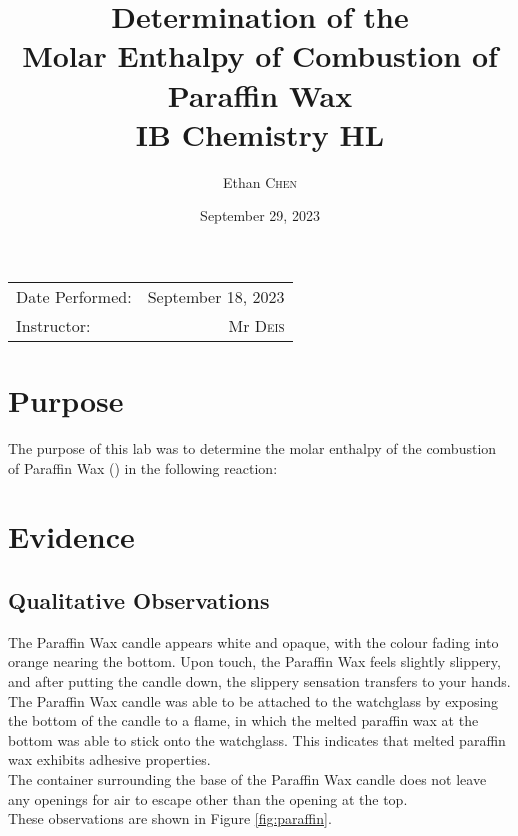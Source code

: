 \documentclass[
	letterpaper, %
	12pt, %
]{CSUniSchoolLabReport}
\title{Determination of the \\ Molar Enthalpy of Combustion of Paraffin Wax \\ IB Chemistry HL} %
\author{Ethan \textsc{Chen}} %
\date{September 29, 2023} %
\begin{document}
\maketitle %

\begin{center}
    \begin{tabular}{l r}
        Date Performed: & September 18, 2023 \\ %
        Instructor:     & Mr \textsc{Deis}   %
    \end{tabular}
\end{center}



\section{Purpose}

The purpose of this lab was to determine the molar enthalpy of the combustion of Paraffin Wax () in the following reaction:

\begin{center}
\end{center}


\section{Evidence}

\subsection{Qualitative Observations}

The Paraffin Wax candle appears white and opaque, with the colour fading into orange nearing the bottom.
Upon touch, the Paraffin Wax feels slightly slippery, and after putting the candle down, the slippery sensation
transfers to your hands.
\\
The Paraffin Wax candle was able to be attached to the watchglass by exposing the
bottom of the candle to a flame, in which the melted paraffin wax at the bottom
was able to stick onto the watchglass. This indicates that melted paraffin wax exhibits
adhesive properties.
\\
The container surrounding the base of the Paraffin Wax candle does not leave
any openings for air to escape other than the opening at the top.
\\
These observations are shown in Figure \ref*{fig:paraffin}.
\end{document}
